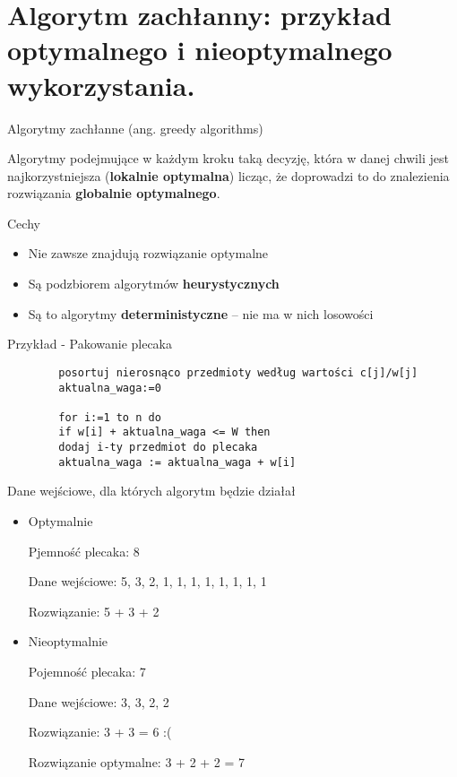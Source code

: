 \documentclass[main.tex]{subfiles}
\begin{document}
    \newpage

    \section{Algorytm zachłanny: przykład optymalnego i nieoptymalnego wykorzystania.}

    \begin{definition}
        Algorytmy zachłanne (ang. greedy algorithms)

        Algorytmy podejmujące w każdym kroku taką decyzję, która w danej chwili jest najkorzystniejsza (\textbf{lokalnie optymalna}) licząc, że doprowadzi to do znalezienia rozwiązania \textbf{globalnie optymalnego}.

        Cechy

        \begin{itemize}
            \item Nie zawsze znajdują rozwiązanie optymalne
            \item Są podzbiorem algorytmów \textbf{heurystycznych}
            \item Są to algorytmy \textbf{deterministyczne} – nie ma w nich losowości
        \end{itemize}

    \end{definition}


    Przykład - Pakowanie plecaka

    \begin{verbatim}
        posortuj nierosnąco przedmioty według wartości c[j]/w[j]
        aktualna_waga:=0

        for i:=1 to n do
        if w[i] + aktualna_waga <= W then
        dodaj i-ty przedmiot do plecaka
        aktualna_waga := aktualna_waga + w[i]
    \end{verbatim}

    Dane wejściowe, dla których algorytm będzie działał
    \begin{itemize}
        \item Optymalnie

        Pjemność plecaka: 8

        Dane wejściowe: 5, 3, 2, 1, 1, 1, 1, 1, 1, 1, 1

        Rozwiązanie: 5 + 3 + 2

        \item Nieoptymalnie

        Pojemność plecaka: 7

        Dane wejściowe: 3, 3, 2, 2

        Rozwiązanie: 3 + 3 = 6 :(

        Rozwiązanie optymalne: 3 + 2 + 2 = 7

    \end{itemize}
\end{document}
